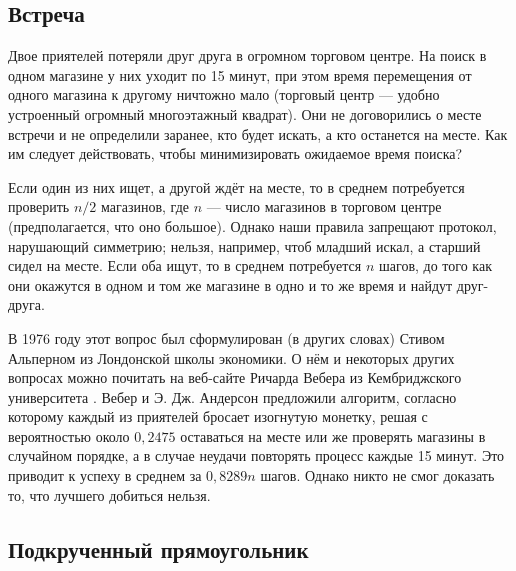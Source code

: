 \subsection*{Встреча}

Двое приятелей потеряли друг друга в огромном торговом центре. %
На поиск в одном магазине у них уходит по 15 минут,
при этом время перемещения от одного магазина к другому ничтожно мало
(торговый центр --- удобно устроенный огромный многоэтажный квадрат).
Они не договорились о месте встречи и не определили заранее, кто будет искать, а кто останется на месте.
Как им следует действовать, чтобы минимизировать ожидаемое время поиска?

\medskip

Если один из них ищет, а другой ждёт на месте, то в среднем потребуется проверить $n/2$ магазинов, где $n$ --- число магазинов в торговом центре (предполагается, что оно большое).
Однако наши правила запрещают протокол, нарушающий симметрию;
нельзя, например, чтоб младший искал, а старший сидел на месте.
Если оба ищут, то в среднем потребуется $n$ шагов, до того как они окажутся в одном и том же магазине в одно и то же время и найдут друг-друга.

В 1976 году этот вопрос был сформулирован (в других словах) Стивом Альперном из Лондонской школы экономики.
О нём и некоторых других вопросах можно почитать на веб-сайте Ричарда Вебера из Кембриджского университета \cite{weber}.
Вебер и Э. Дж. Андерсон предложили алгоритм, согласно которому каждый из приятелей бросает изогнутую монетку, решая с вероятностью около $0{,}2475$ оставаться на месте или же проверять магазины в случайном порядке, а в случае неудачи повторять процесс каждые 15 минут.
Это приводит к успеху в среднем за $0{,}8289n$ шагов.
Однако никто не смог доказать то, что лучшего добиться нельзя.



\subsection*{Подкрученный прямоугольник}

